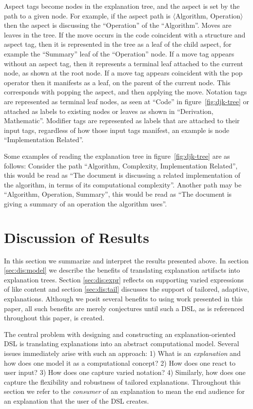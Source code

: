 \documentclass[sigconf]{acmart}
\newcommand{\brackets}[1]{$\langle$\ignorespaces#1\unskip$\rangle$}
\begin{document}
Aspect tags become nodes in the explanation tree, and the aspect is set by the
path to a given node. For example, if the aspect path is \brackets{Algorithm,
  Operation} then the aspect is discussing the ``Operation'' of the
``Algorithm''. Moves are leaves in the tree. If the move occurs in the code
coincident with a structure and aspect tag, then it is represented in the tree
as a leaf of the child aspect, for example the ``Summary'' leaf of the
``Operation'' node. If a move tag appears without an aspect tag, then it
represents a terminal leaf attached to the current node, as shown at the root
node. If a move tag appears coincident with the pop operator then it manifests
as a leaf, on the parent of the current node. This corresponds with popping the
aspect, and then applying the move. Notation tags are represented as terminal
leaf nodes, as seen at ``Code'' in figure~\ref{fig:djk-tree} or attached as
labels to existing nodes or leaves as shown in ``Derivation, Mathematic''.
Modifier tags are represented as labels that are attached to their input tags,
regardless of how those input tags manifest, an example is node ``Implementation
Related''.

Some examples of reading the explanation tree in figure~\ref{fig:djk-tree} are
as follows: Consider the path ``Algorithm, Complexity, Implementation Related'',
this would be read as ``The document is discussing a related implementation of
the algorithm, in terms of its computational complexity''. Another path may be
``Algorithm, Operation, Summary'', this would be read as ``The document is
giving a summary of an operation the algorithm uses''.

\section{Discussion of Results}
\label{sec:dis}
In this section we summarize and interpret the results presented above. In
section \ref{sec:dis:model} we describe the benefits of translating explanation
artifacts into explanation trees. Section \ref{sec:dis:expr} reflects on
supporting varied expressions of like content and section \ref{sec:dis:tail}
discusses the support of tailored, adaptive, explanations. Although we posit
several benefits to using work presented in this paper, all such benefits are
merely conjectures until such a DSL, as is referenced throughout this paper, is
created. 

The central problem with designing and constructing an explanation-oriented DSL
is translating explanations into an abstract computational model. Several issues
immediately arise with such an approach: 1) What is an \emph{explanation} and
how does one model it as a computational concept? 2) How does one react to user
input? 3) How does one capture varied notation? 4) Similarly, how does one
capture the flexibility and robustness of tailored explanations. Throughout this
section we refer to the \emph{consumer} of an explanation to mean the end
audience for an explanation that the user of the DSL creates.
\end{document}
